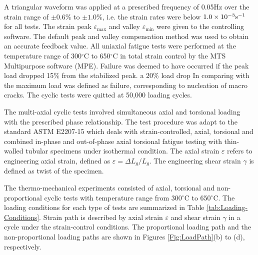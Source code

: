 A triangular waveform was applied at a prescribed frequency of 0.05Hz over the strain range of $\pm 0.6\%$ to $\pm 1.0\%$, i.e. the strain rates were below $1.0\times 10^{-3}\rm{s}^{-1}$ for all tests.
The strain peak  $\varepsilon_{\max}$ and valley $\varepsilon_{\min}$ were given to the controlling software.
The default peak and valley compensation method was used to obtain an accurate feedback value.
All uniaxial fatigue tests were performed at the temperature range of 300$^{\circ}$C to 650$^{\circ}$C in total strain control by the MTS Multipurpose software (MPE).
Failure was deemed to have occurred if the peak load dropped 15\% from the stabilized peak. a 20\% load drop In comparing with the maximum load  was defined as failure, corresponding to nucleation of macro cracks.
The cyclic tests were quitted at 50,000 loading cycles.

The multi-axial cyclic tests involved simultaneous axial and torsional loading with the prescribed phase relationship.
The test procedure was adapt to the standard ASTM E2207-15 which deals with strain-controlled, axial, torsional and combined in-phase and out-of-phase axial torsional fatigue testing with thin-walled tubular specimens under isothermal condition.
The axial strain $\varepsilon$ refers to engineering axial strain, defined as $\varepsilon=\Delta L_g/L_g$. The engineering shear strain $\gamma$ is defined as twist of the specimen.

The thermo-mechanical experiments consisted of axial, torsional and non-proportional cyclic tests with temperature range from 300$^{\circ}$C to 650$^{\circ}$C. The loading conditions for each type of tests are summarized in Table \ref{tab:Loading-Conditions}.
Strain path is described by axial strain $\varepsilon$ and shear strain $\gamma$ in a cycle under the  strain-control conditions. The proportional loading path and the non-proportional loading paths are shown in Figures \ref{Fig:LoadPath}(b) to (d), respectively.


